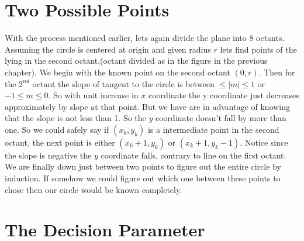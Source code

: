 \documentclass[a4paper,12pt,oneside]{book}
\begin{document}
 \section{Two Possible Points}
 With the process mentioned earlier, lets again divide the plane into 8 octants. Assuming the circle is centered at origin and given radius $r$ lets find points of the  lying in the second octant,(octant divided as in the figure in the previous chapter). We begin with the known point on the second octant $(0,r)$. Then for the $2^{nd}$ octant the slope of tangent to the circle is between $\leq \vert m \vert \leq 1$ or $-1\leq m \leq 0$. So with unit increase in $x$ coordinate the y coordinate just decreases approximately by slope at that point. But we have are in advantage of knowing that the slope is not less than 1. So the $y$ coordinate doesn't fall by more than one. So we could safely say if $(x_k,y_k)$ is a intermediate point in the second octant, the next point is either  $(x_k+1,y_k)$ or $(x_k+1,y_k-1)$. Notice since the slope is negative the $y$ coordinate falls, contrary to line on the first octant. We are finally down just between two points to figure out the entire circle by induction. If somehow we could figure out which one between these points to chose then our circle would be known completely. 
 \section{The Decision Parameter}
 
\end{document}
